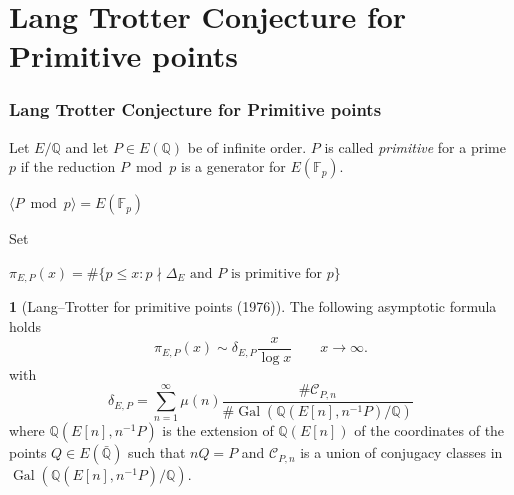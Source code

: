 \documentclass[10pt,handout]{beamer} %
\newcommand{\Q}{\mathbb Q}
\newcommand{\F}{\mathbb F}
\theoremstyle{definition}
\newtheorem{conj}[theorem]{\translate{Conjecture}}
\begin{document}
\section{Lang Trotter Conjecture for Primitive points}

\begin{frame}
\frametitle{Lang Trotter Conjecture for Primitive points} \pause

\begin{definition}
   Let $E/\Q$ and let $P\in E(\Q)$ be of infinite order. 
   $P$ is called \emph{primitive} for a prime $p$ if the reduction $P\bmod p$ is a generator for $E(\F_p)$.\\ \pause
\centerline{\alert{$\langle P\bmod p\rangle =E(\F_p)$}}
\end{definition}\pause
Set \\
\centerline{$\pi_{E,P}(x)=\#\{p\le x: p\nmid\Delta_E\text{ and } P\text{ is primitive for } p\}$}\pause

\begin{conj}[Lang--Trotter for primitive points (1976)] The following asymptotic formula holds
$$\pi_{E,P}(x)\sim \delta_{E,P}\frac x{\log x}\qquad x\rightarrow\infty.$$
with\vspace*{-4pt}\pause
$$\delta_{E,P}=\sum_{n=1}^\infty\mu(n)\frac{\#\mathcal C_{P,n}}{\#\operatorname{Gal}(\Q(E[n],n^{-1}P)/\Q)}$$\pause
where $\Q(E[n],n^{-1}P)$ is the extension of $\Q(E[n])$ of the coordinates of the points
$Q\in E(\bar{\Q})$ such that $nQ=P$ and $\mathcal C_{P,n}$ is a union of conjugacy classes in 
$\operatorname{Gal}(\Q(E[n],n^{-1}P)/\Q)$.
\end{conj}
\end{frame}
\end{document}

